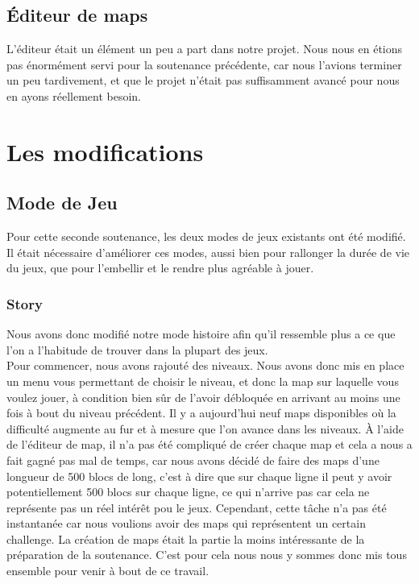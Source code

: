\documentclass [11pt]{report}
\begin{document}
		\vspace{10mm}


	\section{\'Editeur de maps}
	
	\vspace{3mm}
	
		L'éditeur était un élément un peu a part dans notre projet. Nous nous en étions pas énormément servi pour la soutenance précédente, car nous l'avions terminer un peu tardivement, et que le projet n'était pas suffisamment avancé pour nous en ayons réellement besoin.
		
		
		\vspace{10mm}
		
		
\chapter{Les modifications}
	\section{Mode de Jeu}
		Pour cette seconde soutenance, les deux modes de jeux existants ont été modifié.
		Il était nécessaire d'améliorer ces modes, aussi bien pour rallonger la durée de vie du jeux, que pour l'embellir et le rendre plus agréable à jouer.
		\vspace{10mm}
		\subsection{Story}
			Nous avons donc modifié notre mode histoire afin qu'il ressemble plus a ce que l'on a l'habitude de trouver dans la plupart des jeux.\\
			
			\indent Pour commencer, nous avons rajout\'e des niveaux. Nous avons donc mis en place un menu vous permettant de choisir le niveau, et donc la map sur laquelle vous voulez jouer, à condition bien s\^ur de l'avoir débloquée en arrivant au moins une fois à bout du niveau précédent. Il y a aujourd'hui neuf maps disponibles o\`u la difficulté augmente au fur et à mesure que l'on avance dans les niveaux. \`A l'aide de l'éditeur de map, il n'a pas été compliqué de créer chaque map et cela a nous a fait gagné pas mal de temps, car nous avons décidé de faire des maps d'une longueur de 500 blocs de long, c'est \`a dire que sur chaque ligne il peut y avoir potentiellement 500 blocs sur chaque ligne, ce qui n'arrive pas car cela ne représente pas un réel intérêt pou le jeux. Cependant, cette t\^ache n'a pas \'et\'e instantanée car nous voulions avoir des maps qui représentent un certain challenge. La création de maps était la partie la moins intéressante de la préparation de la soutenance. C'est pour cela nous nous y sommes donc mis tous ensemble pour venir à bout de ce travail.\\
			
\end{document}

